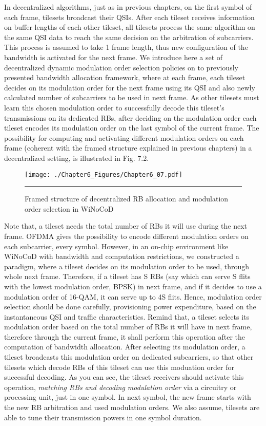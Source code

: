 In decentralized algorithms, just as in previous chapters, on the first symbol of each frame, tilesets broadcast their QSIs. After each tileset receives information on buffer lengths of each other tileset, all tilesets process the same algorithm on the same QSI data to reach the same decision on the arbitration of subcarriers. This process is assumed to take 1 frame length, thus new configuration of the bandwidth is activated for the next frame. We introduce here a set of decentralized dynamic modulation order selection policies on to previously presented bandwidth allocation framework, where at each frame, each tileset decides on its modulation order for the next frame using its QSI and also newly calculated number of subcarriers to be used in next frame. As other tilesets must learn this chosen modulation order to successfully decode this tileset's transmissions on its dedicated RBs, after deciding on the modulation order each tileset encodes its modulation order on the last symbol of the current frame. The possibility for computing and activating different modulation orders on each frame (coherent with the framed structure explained in previous chapters) in a decentralized setting, is illustrated in Fig. 7.2. 

\begin{figure}[htbp]
  \centering
    \texttt{[image: ./Chapter6\_Figures/Chapter6\_07.pdf]}
    \rule{35em}{0.5pt}
  \caption[Decentralized RB allocation and modulation order selection in WiNoCoD]{Framed structure of decentralized RB allocation and modulation order selection in WiNoCoD} 
  \label{fig:Electron}
\end{figure}

Note that, a tileset needs the total number of RBs it will use during the next frame. OFDMA gives the possibility to encode different modulation orders on each subcarrier, every symbol. However, in an on-chip environment like WiNoCoD with bandwidth and computation restrictions, we constructed a paradigm, where a tileset decides on its modulation order to be used, through whole next frame. Therefore, if a tileset has S RBs (say which can serve S flits with the lowest modulation order, BPSK) in next frame, and if it decides to use a modulation order of 16-QAM, it can serve up to 4S flits. Hence, modulation order selection should be done carefully, provisioning power expenditure, based on the instantaneous QSI and traffic characteristics. Remind that, a tileset selects its modulation order based on the total number of RBs it will have in next frame, therefore through the current frame, it shall perform this operation after the computation of bandwidth allocation. After selecting its modulation order, a tileset broadcasts this modulation order on dedicated subcarriers, so that other tilesets which decode RBs of this tileset can use this moduation order for successful decoding. As you can see, the tileset receivers should activate this operation, \textit{matching RBs and decoding modulation order} via a circuitry or processing unit, just in one symbol. In next symbol, the new frame starts with the new RB arbitration and used modulation orders. We also assume, tilesets are able to tune their transmission powers in one symbol duration.    


